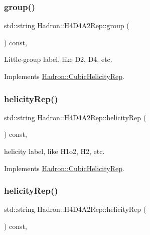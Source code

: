 \subsubsection{\texorpdfstring{group()}{group()}\hspace{0.1cm}{\footnotesize\ttfamily [5/5]}}
{\footnotesize\ttfamily std\+::string Hadron\+::\+H4\+D4\+A2\+Rep\+::group (\begin{DoxyParamCaption}{ }\end{DoxyParamCaption}) const\hspace{0.3cm}{\ttfamily [inline]}, {\ttfamily [virtual]}}

Little-\/group label, like D2, D4, etc. 

Implements \mbox{\hyperlink{structHadron_1_1CubicHelicityRep_a101a7d76cd8ccdad0f272db44b766113}{Hadron\+::\+Cubic\+Helicity\+Rep}}.

\mbox{\label{structHadron_1_1H4D4A2Rep_a6f131b590922aebb01c15d0f9a0b9d1b}} 
\subsubsection{\texorpdfstring{helicityRep()}{helicityRep()}\hspace{0.1cm}{\footnotesize\ttfamily [1/3]}}
{\footnotesize\ttfamily std\+::string Hadron\+::\+H4\+D4\+A2\+Rep\+::helicity\+Rep (\begin{DoxyParamCaption}{ }\end{DoxyParamCaption}) const\hspace{0.3cm}{\ttfamily [inline]}, {\ttfamily [virtual]}}

helicity label, like H1o2, H2, etc. 

Implements \mbox{\hyperlink{structHadron_1_1CubicHelicityRep_af1096946b7470edf0a55451cc662f231}{Hadron\+::\+Cubic\+Helicity\+Rep}}.

\mbox{\label{structHadron_1_1H4D4A2Rep_a6f131b590922aebb01c15d0f9a0b9d1b}} 
\subsubsection{\texorpdfstring{helicityRep()}{helicityRep()}\hspace{0.1cm}{\footnotesize\ttfamily [2/3]}}
{\footnotesize\ttfamily std\+::string Hadron\+::\+H4\+D4\+A2\+Rep\+::helicity\+Rep (\begin{DoxyParamCaption}{ }\end{DoxyParamCaption}) const\hspace{0.3cm}{\ttfamily [inline]}, {\ttfamily [virtual]}}

